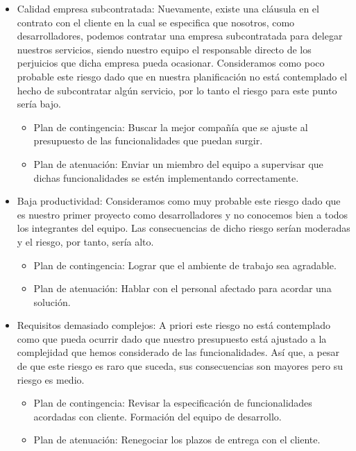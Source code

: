 \documentclass[a4paper,11pt]{report}
\begin{document}
\begin{itemize}
    \item Calidad empresa subcontratada: Nuevamente, existe una cláusula en el
    contrato con el cliente en la cual se especifica que nosotros, como
    desarrolladores, podemos contratar una empresa subcontratada para delegar
    nuestros servicios, siendo nuestro equipo el responsable directo de los
    perjuicios que dicha empresa pueda ocasionar. Consideramos como poco
    probable este riesgo dado que en nuestra planificación no está contemplado
    el hecho de subcontratar algún servicio, por lo tanto el riesgo para este
    punto sería bajo.
    \begin{itemize}
        \item Plan de contingencia: Buscar la mejor compañía que se ajuste al
        presupuesto de las funcionalidades que puedan surgir.
        \item Plan de atenuación: Enviar un miembro del equipo a supervisar
        que dichas funcionalidades se estén implementando correctamente.
    \end{itemize}

    \item Baja productividad: Consideramos como muy probable este riesgo dado
    que es nuestro primer proyecto como desarrolladores y no conocemos bien a
    todos los integrantes del equipo. Las consecuencias de dicho riesgo serían
    moderadas y el riesgo, por tanto, sería alto.
    \begin{itemize}
        \item Plan de contingencia: Lograr que el ambiente de trabajo sea
        agradable.
        \item Plan de atenuación: Hablar con el personal afectado para acordar
        una solución.
    \end{itemize}

    \item Requisitos demasiado complejos: A priori este riesgo no está
    contemplado como que pueda ocurrir dado que nuestro presupuesto está
    ajustado a la complejidad que hemos considerado de las funcionalidades.
    Así que, a pesar de que este riesgo es raro que suceda, sus consecuencias
    son mayores pero su riesgo es medio.
    \begin{itemize}
        \item Plan de contingencia: Revisar la especificación de funcionalidades
        acordadas con cliente. Formación del equipo de desarrollo.
        \item Plan de atenuación: Renegociar los plazos de entrega con el
        cliente.
    \end{itemize}


\end{itemize}
\end{document}
